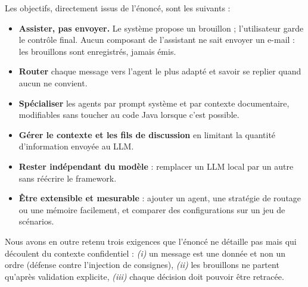 Les objectifs, directement issus de l'énoncé, sont les suivants :
\begin{itemize}
  \item \textbf{Assister, pas envoyer.} Le système propose un brouillon ; l'utilisateur garde le contrôle final. Aucun composant de l'assistant ne sait envoyer un e-mail : les brouillons sont enregistrés, jamais émis.
  \item \textbf{Router} chaque message vers l'agent le plus adapté et savoir se replier quand aucun ne convient.
  \item \textbf{Spécialiser} les agents par prompt système et par contexte documentaire, modifiables sans toucher au code Java lorsque c'est possible.
  \item \textbf{Gérer le contexte et les fils de discussion} en limitant la quantité d'information envoyée au LLM.
  \item \textbf{Rester indépendant du modèle} : remplacer un LLM local par un autre sans réécrire le framework.
  \item \textbf{Être extensible et mesurable} : ajouter un agent, une stratégie de routage ou une mémoire facilement, et comparer des configurations sur un jeu de scénarios.
\end{itemize}

Nous avons en outre retenu trois exigences que l'énoncé ne détaille pas mais qui découlent du contexte confidentiel : \emph{(i)} un message est une donnée et non un ordre (défense contre l'injection de consignes), \emph{(ii)} les brouillons ne partent qu'après validation explicite, \emph{(iii)} chaque décision doit pouvoir être retracée.

